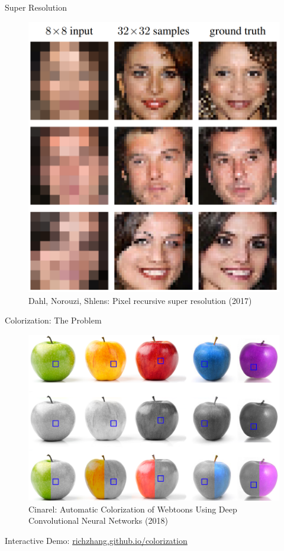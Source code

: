\documentclass{beamer}
\begin{document}
\begin{frame}{Super Resolution}
\begin{figure}[ht]
    \centering
    \includegraphics[width=0.8\paperwidth, height=0.7\paperheight, keepaspectratio]{graphics/pixel-recursive-super-resolution.png}
    \captionsetup{labelformat=empty}
    \caption{Dahl, Norouzi, Shlens: Pixel recursive super resolution (2017)}
\end{figure}
\end{frame}


\begin{frame}{Colorization: The Problem}
\begin{figure}[ht]
    \centering
    \includegraphics[width=0.8\paperwidth, height=0.7\paperheight, keepaspectratio]{graphics/multimodality-apple.png}
    \captionsetup{labelformat=empty}
    \caption{Cinarel: Automatic Colorization of Webtoons Using Deep Convolutional Neural Networks (2018)}
\end{figure}

Interactive Demo: \href{http://richzhang.github.io/colorization/}{richzhang.github.io/colorization}
\end{frame}
\end{document}
